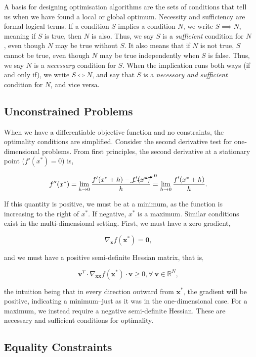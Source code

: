 \documentclass[11pt]{amsart}
\begin{document}
A basis for designing optimisation algorithms are the sets of conditions that tell us when we have found a local or global optimum. Necessity and sufficiency are formal logical terms. If a condition $S$ implies a condition $N$, we write $S \implies N$, meaning if $S$ is true, then $N$ is also. Thus, we say $S$ is a \emph{sufficient} condition for $N$, even though $N$ may be true without $S$. It also means that if $N$ is not true, $S$ cannot be true, even though $N$ may be true independently when $S$ is false. Thus, we say $N$ is a \emph{necessary} condition for $S$. When the implication runs both ways (if and only if), we write $S \iff N$, and say that $S$ is a \emph{necessary and sufficient} condition for $N$, and vice versa.

\subsection{Unconstrained Problems}

When we have a differentiable objective function and no constraints, the optimality conditions are simplified. Consider the second derivative test for one-dimensional problems. From first principles, the second derivative at a stationary point ($f'(x^*) = 0$) is,

$$f''(x^*) = \lim_{h \to 0}\frac{f'(x^* + h) - \cancelto{0}{f'(x^*)}}{h} = \lim_{h \to 0}\frac{f'(x^* + h)}{h}.$$

If this quantity is positive, we must be at a minimum, as the function is increasing to the right of $x^*$. If negative, $x^*$ is a maximum. Similar conditions exist in the multi-dimensional setting. First, we must have a zero gradient,

$$\nabla_{\mathbf{x}}f(\mathbf{x}^*) = \mathbf{0},$$

and we must have a positive semi-definite Hessian matrix, that is,

$$\mathbf{v}^T\cdot\nabla_{\mathbf{xx}}f(\mathbf{x}^*)\cdot\mathbf{v} \geq 0, \forall \ \mathbf{v} \in \mathbb{R}^N,$$

the intuition being that in every direction outward from $\mathbf{x}^*$, the gradient will be positive, indicating a minimum--just as it was in the one-dimensional case. For a maximum, we instead require a negative semi-definite Hessian. These are necessary and sufficient conditions for optimality.

\subsection{Equality Constraints}
\end{document}
